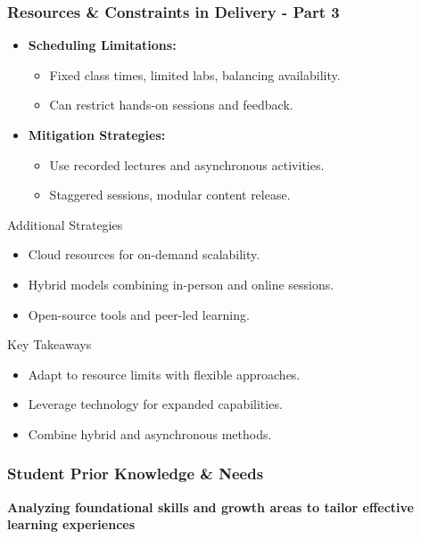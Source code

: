 \documentclass{beamer}
\begin{document}
\begin{frame}[fragile]
  \frametitle{Resources \& Constraints in Delivery - Part 3}
  \pause
  \begin{itemize}
    \item \textbf{Scheduling Limitations:}
      \begin{itemize}
        \item Fixed class times, limited labs, balancing availability.
        \item Can restrict hands-on sessions and feedback.
      \end{itemize}
    \item \textbf{Mitigation Strategies:}
      \begin{itemize}
        \item Use recorded lectures and asynchronous activities.
        \item Staggered sessions, modular content release.
      \end{itemize}
  \end{itemize}
  \pause
  \begin{block}{Additional Strategies}
    \begin{itemize}
      \item Cloud resources for on-demand scalability.
      \item Hybrid models combining in-person and online sessions.
      \item Open-source tools and peer-led learning.
    \end{itemize}
  \end{block}
  \pause
  \begin{block}{Key Takeaways}
    \begin{itemize}
      \item Adapt to resource limits with flexible approaches.
      \item Leverage technology for expanded capabilities.
      \item Combine hybrid and asynchronous methods.
    \end{itemize}
  \end{block}
\end{frame}

\begin{frame}[fragile]
    \frametitle{Student Prior Knowledge \& Needs}
    \begin{center}
        \textbf{Analyzing foundational skills and growth areas to tailor effective learning experiences}
    \end{center}
\end{frame}
\end{document}
